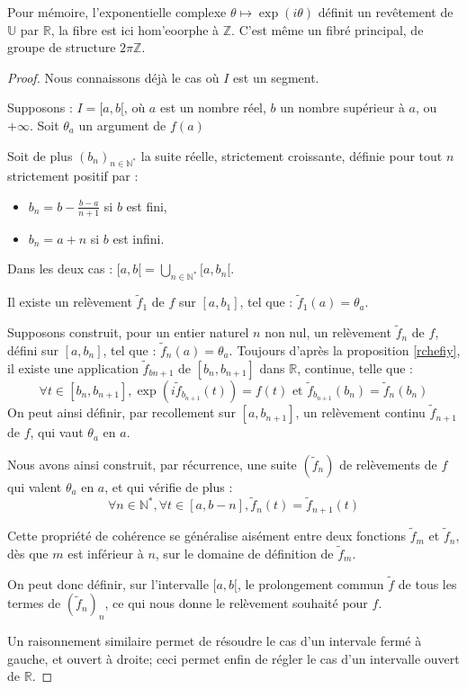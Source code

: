 Pour m\'emoire, l'exponentielle complexe $\theta \mapsto \exp (i\theta )$ d\'efinit un rev\^etement de $\mathbb{U}$ par $\mathbb{R}$, %
la fibre est ici hom'eoorphe \`a $\mathbb{Z}$. C'est m\^eme un fibr\'e principal, de groupe de structure $2\pi\mathbb{Z}$.

\begin{proof}
Nous connaissons d\'ej\`a le cas o\`u $I$ est un segment.

\par
Supposons : $I=[a,b[$, o\`u $a$ est un nombre r\'eel, $b$ un nombre sup\'erieur \`a $a$, ou $+\infty$. Soit $\theta_a$ un argument de $f(a)$

\par
Soit de plus $(b_n)_{n\in\mathbb{N}^{\ast}}$ la suite r\'eelle, strictement croissante, d\'efinie pour tout $n$ strictement positif par :
\begin{itemize}
\item $b_n=b-\frac{b-a}{n+1}$ si $b$ est fini,
\item $b_n=a+n$ si $b$ est infini.
\end{itemize}
Dans les deux cas : $[a,b[=\underset{n\in\mathbb{N}^{\ast}}{\bigcup}[a,b_n[$.

\par
Il existe un rel\`evement $\tilde{f}_1$ de $f$ sur $[a,b_1]$,  tel que : $\tilde{f}_1(a)=\theta_a$.

\par
Supposons construit, pour un entier naturel $n$ non nul, un rel\`evement $\tilde{f}_n$ de $f$, d\'efini sur $[a,b_n]$, tel que : $\tilde{f}_n(a)=\theta_a$. %
Toujours d'apr\`es la proposition \ref{rchefiy}, %
il existe une application $\tilde{f}_{b{n+1}}$ de $[b_n,b_{n+1}]$ dans $\mathbb{R}$, continue, telle que :
\[\forall t \in [b_n,b_{n+1}], \exp (i\tilde{f}_{b_{n+1}}(t))=f(t) \text{ et }\tilde{f}_{b_{n+1}}(b_n)=\tilde{f}_n(b_n)\]
On peut ainsi d\'efinir, par recollement sur $[a,b_{n+1}]$, un rel\`evement continu $\tilde{f}_{n+1}$ de $f$, qui vaut $\theta_a$ en $a$.

\par
Nous avons ainsi construit, par r\'ecurrence, une suite $(\tilde{f}_n)$ de rel\`evements de $f$ qui valent $\theta_a$ en $a$, et qui v\'erifie de plus :
\[\forall n \in\mathbb{N}^{\ast}, \forall t \in [a,b-n], \tilde{f}_n(t)=\tilde{f}_{n+1}(t)\]

Cette propri\'et\'e de coh\'erence se g\'en\'eralise ais\'ement entre deux fonctions $\tilde{f}_m$ et $\tilde{f}_n$, %
d\`es que $m$ est inf\'erieur \`a $n$, sur le domaine de d\'efinition de $\tilde{f}_m$.

\par
On peut donc d\'efinir, sur l'intervalle $[a,b[$, le prolongement commun $\tilde{f}$ de tous les termes de $(\tilde{f}_n)_n$, %
ce qui nous donne le rel\`evement souhait\'e pour $f$.

\par
Un raisonnement similaire permet de r\'esoudre le cas d'un intervale ferm\'e \`a gauche, et ouvert \`a droite; %
ceci permet enfin de r\'egler le cas d'un intervalle ouvert de $\mathbb{R}$.
\end{proof}

